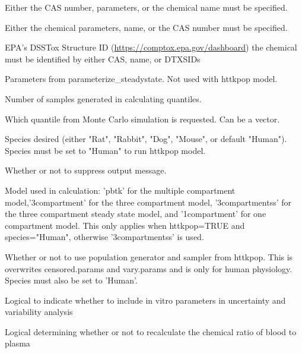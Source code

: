 \documentclass[a4paper]{book}
\begin{document}
\begin{Arguments}
\begin{ldescription}
\item[\code{chem.cas}] Either the CAS number, parameters, or the chemical name must
be specified.

\item[\code{chem.name}] Either the chemical parameters, name, or the CAS number
must be specified.

\item[\code{dtxsid}] EPA's DSSTox Structure ID (\url{https://comptox.epa.gov/dashboard})
the chemical must be identified by either CAS, name, or DTXSIDs

\item[\code{parameters}] Parameters from parameterize\_steadystate. Not used with
httkpop model.

\item[\code{samples}] Number of samples generated in calculating quantiles.

\item[\code{which.quantile}] Which quantile from Monte Carlo simulation is
requested. Can be a vector.

\item[\code{species}] Species desired (either "Rat", "Rabbit", "Dog", "Mouse", or
default "Human").  Species must be set to "Human" to run httkpop model.

\item[\code{suppress.messages}] Whether or not to suppress output message.

\item[\code{model}] Model used in calculation: 'pbtk' for the multiple compartment
model,'3compartment' for the three compartment model, '3compartmentss' for
the three compartment steady state model, and '1compartment' for one
compartment model.  This only applies when httkpop=TRUE and species="Human",
otherwise '3compartmentss' is used.

\item[\code{httkpop}] Whether or not to use population generator and sampler from
httkpop.  This is overwrites censored.params and vary.params and is only for
human physiology.  Species must also be set to 'Human'.

\item[\code{invitrouv}] Logical to indicate whether to include in vitro parameters
in uncertainty and variability analysis

\item[\code{calcrb2p}] Logical determining whether or not to recalculate the 
chemical ratio of blood to plasma


\end{ldescription}
\end{Arguments}
\end{document}
